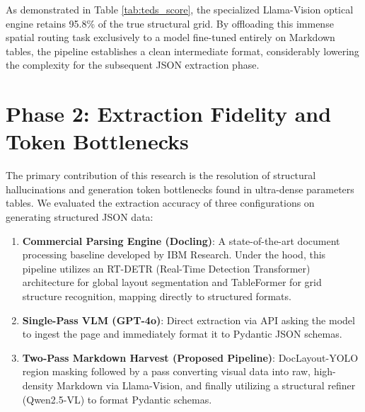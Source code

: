 As demonstrated in Table \ref{tab:teds_score}, the specialized Llama-Vision optical engine retains 95.8\% of the true structural grid. By offloading this immense spatial routing task exclusively to a model fine-tuned entirely on Markdown tables, the pipeline establishes a clean intermediate format, considerably lowering the complexity for the subsequent JSON extraction phase.

\section{Phase 2: Extraction Fidelity and Token Bottlenecks}
\label{sec:extraction_results}

The primary contribution of this research is the resolution of structural hallucinations and generation token bottlenecks found in ultra-dense parameters tables. We evaluated the extraction accuracy of three configurations on generating structured JSON data:
\begin{enumerate}
    \item \textbf{Commercial Parsing Engine (Docling)}: A state-of-the-art document processing baseline developed by IBM Research. Under the hood, this pipeline utilizes an RT-DETR (Real-Time Detection Transformer) architecture for global layout segmentation and TableFormer for grid structure recognition, mapping directly to structured formats.
    \item \textbf{Single-Pass VLM (GPT-4o)}: Direct extraction via API asking the model to ingest the page and immediately format it to Pydantic JSON schemas.
    \item \textbf{Two-Pass Markdown Harvest (Proposed Pipeline)}: DocLayout-YOLO region masking followed by a pass converting visual data into raw, high-density Markdown via Llama-Vision, and finally utilizing a structural refiner (Qwen2.5-VL) to format Pydantic schemas.
\end{enumerate}

